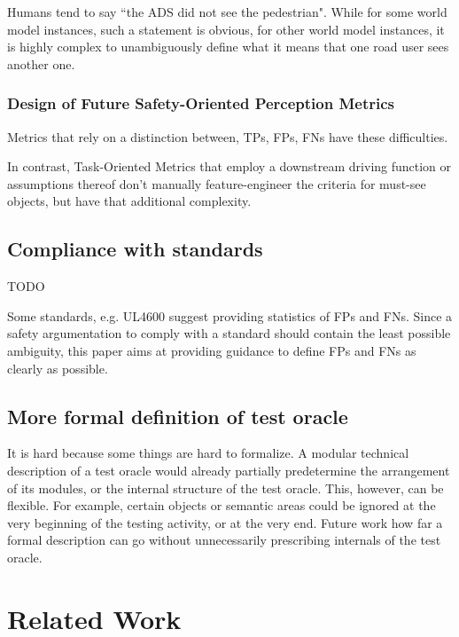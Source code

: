 \documentclass[conference]{IEEEtran}
\begin{document}
Humans tend to say ``the ADS did not see the pedestrian". While for some world model instances, such a statement is obvious, for other world model instances, it is highly complex to unambiguously define what it means that one road user sees another one. 


\subsubsection{Design of Future Safety-Oriented Perception Metrics}

Metrics that rely on a distinction between, TPs, FPs, FNs have these difficulties. 

In contrast, Task-Oriented Metrics that employ a downstream driving function or assumptions thereof don't manually feature-engineer the criteria for must-see objects, but have that additional complexity. 


\subsection{Compliance with standards}

TODO

Some standards, e.g. UL4600 \cite[Sec. 8.4.1.2]{UL4600_voting_2019} suggest providing statistics of FPs and FNs. 
Since a safety argumentation to comply with a standard should contain the least possible ambiguity, this paper aims at providing guidance to define FPs and FNs as clearly as possible. 



\subsection{More formal definition of test oracle}

It is hard because some things are hard to formalize.
A modular technical description of a test oracle would already partially predetermine the arrangement of its modules, or the internal structure of the test oracle. This, however, can be flexible. For example, certain objects or semantic areas could be ignored at the very beginning of the testing activity, or at the very end. 
Future work how far a formal description can go without unnecessarily prescribing internals of the test oracle. 



\section{Related Work}
\label{sec:related_work}
\end{document}
